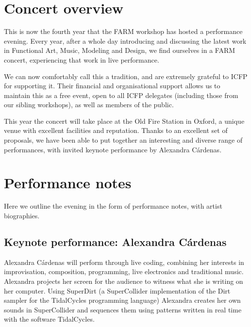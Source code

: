 \documentclass[sigplan,10pt,review]{acmart}\settopmatter{printfolios=true}
\begin{document}

\maketitle

\section{Concert overview}

This is now the fourth year that the FARM workshop has hosted a
performance evening. Every year, after a whole day introducing and
discussing the latest work in Functional Art, Music, Modeling and
Design, we find ourselves in a FARM concert, experiencing that work in
live performance. 

We can now comfortably call this a tradition, and are extremely
grateful to ICFP for supporting it. Their financial and organisational
support allows us to maintain this as a free event, open to all
ICFP delegates (including those from our sibling workshops), as well
as members of the public. 

This year the concert will take place at the Old Fire Station in
Oxford, a unique venue with excellent facilities and
reputation. Thanks to an excellent set of proposals, we have been able
to put together an interesting and diverse range of performances, with
invited keynote performance by Alexandra C\'{a}rdenas.

\section{Performance notes}

Here we outline the evening in the form of performance notes, with 
artist biographies.

\subsection{Keynote performance: Alexandra C\'ardenas}

Alexandra C\'{a}rdenas will perform through live coding, combining her
interests in improvisation, composition, programming, live electronics
and traditional music. Alexandra projects her screen for the audience
to witness what she is writing on her computer. Using SuperDirt (a
SuperCollider implementation of the Dirt sampler for the TidalCycles
programming language) Alexandra creates her own sounds in
SuperCollider and sequences them using patterns written in real time
with the software TidalCycles.
\end{document}
